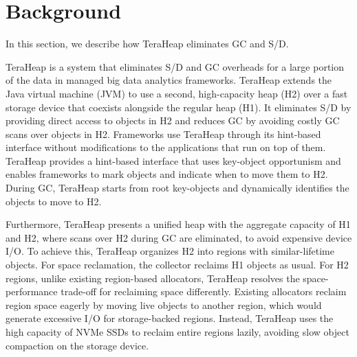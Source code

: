\section{Background}
\label{sec:background}

In this section, we describe how TeraHeap eliminates GC and S/D.

TeraHeap is a system that eliminates S/D
and GC overheads for a large portion of the data in managed big data
analytics frameworks. TeraHeap extends the Java virtual machine
(JVM) to use a second, high-capacity heap (H2) over a fast storage
device that coexists alongside the regular heap (H1). It eliminates
S/D by providing direct access to objects in H2 and reduces GC
by avoiding costly GC scans over objects in H2. Frameworks use
TeraHeap through its hint-based interface without modifications to
the applications that run on top of them.
TeraHeap provides a hint-based interface that uses key-object opportunism
and enables frameworks to mark objects and indicate when to move
them to H2. During GC, TeraHeap starts from root key-objects and
dynamically identifies the objects to move to H2.

Furthermore, TeraHeap presents a unified heap
with the aggregate capacity of H1 and H2, where scans over H2
during GC are eliminated, to avoid expensive device I/O. To achieve
this, TeraHeap organizes H2 into regions with similar-lifetime objects. 
For space reclamation, the collector reclaims H1
objects as usual. For H2 regions, unlike existing region-based allocators, 
TeraHeap resolves the space-performance trade-off
for reclaiming space differently. Existing allocators reclaim region
space eagerly by moving live objects to another region, which would
generate excessive I/O for storage-backed regions. Instead, 
TeraHeap uses the high capacity of NVMe SSDs to reclaim entire regions
lazily, avoiding slow object compaction on the storage device.


